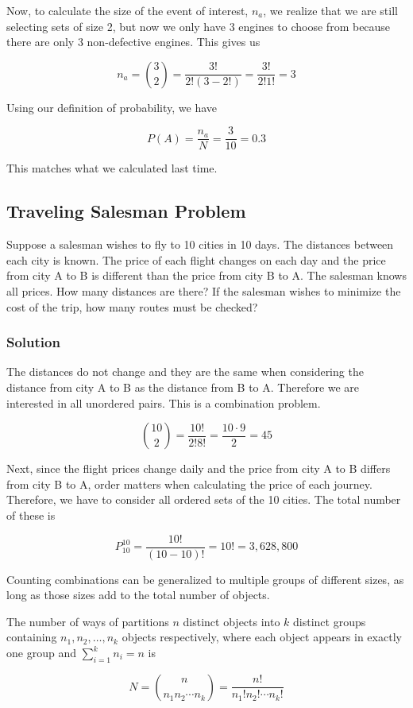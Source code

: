 \documentclass[11pt]{article}
\theoremstyle{definition}
\begin{document}
Now, to calculate the size of the event of interest, $n_a$, we realize that we are still selecting sets of size 2, but now we only have 3 engines to choose from because there are only 3 non-defective engines. This gives us

$$
	n_a = {3 \choose 2} = \frac{3!}{2!(3-2!)} = \frac{3!}{2!1!} = 3
$$

Using our definition of probability, we have

$$
	P(A) = \frac{n_a}{N} = \frac{3}{10} = 0.3
$$

This matches what we calculated last time.

\subsection{Traveling Salesman Problem}

Suppose a salesman wishes to fly to 10 cities in 10 days. The distances between each city is known. The price of each flight changes on each day and the price from city A to B is different than the price from city B to A. The salesman knows all prices. How many distances are there? If the salesman wishes to minimize the cost of the trip, how many routes must be checked?

\subsubsection*{Solution}

The distances do not change and they are the same when considering the distance from city A to B as the distance from B to A. Therefore we are interested in all unordered pairs. This is a combination problem.

$$
	{10\choose2} = \frac{10!}{2!8!} = \frac{10 \cdot 9}{2} = 45
$$

Next, since the flight prices change daily and the price from city A to B differs from city B to A, order matters when calculating the price of each journey. Therefore, we have to consider all ordered sets of the 10 cities. The total number of these is

$$
	P^{10}_{10} = \frac{10!}{(10-10)!} = 10! = 3,628,800
$$

Counting combinations can be generalized to multiple groups of different sizes, as long as those sizes add to the total number of objects.

\begin{shaded}
	The number of ways of partitions $n$ distinct objects into $k$ distinct groups containing $n_1, n_2, \ldots, n_k$ objects respectively, where each object appears in exactly one group and $\sum_{i=1}^k n_i = n$ is
	
	$$
		N = {n \choose n_1 n_2 \cdots n_k } = \frac{n!}{n_1!n_2!\cdots n_k!}
	$$
\end{shaded}
\end{document}
